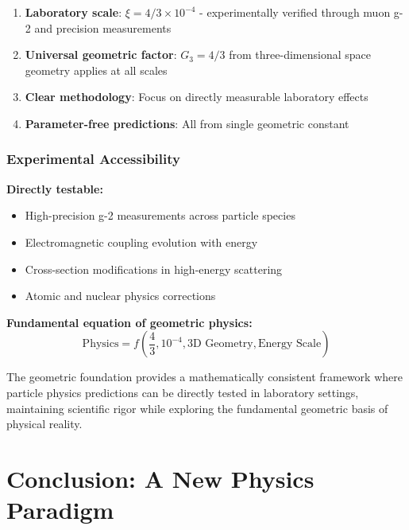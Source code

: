 \documentclass[12pt,a4paper]{report}
\begin{document}
\begin{enumerate}
	\item \textbf{Laboratory scale}: $\xi = 4/3 \times 10^{-4}$ - experimentally verified through muon g-2 and precision measurements
	
	\item \textbf{Universal geometric factor}: $G_3 = 4/3$ from three-dimensional space geometry applies at all scales
	
	\item \textbf{Clear methodology}: Focus on directly measurable laboratory effects
	
	\item \textbf{Parameter-free predictions}: All from single geometric constant
\end{enumerate}

\subsection{Experimental Accessibility}
\label{subsec:experimental_accessibility}

\textbf{Directly testable:}
\begin{itemize}
	\item High-precision g-2 measurements across particle species
	\item Electromagnetic coupling evolution with energy
	\item Cross-section modifications in high-energy scattering
	\item Atomic and nuclear physics corrections
\end{itemize}

\textbf{Fundamental equation of geometric physics:}
\begin{equation}
	\boxed{\text{Physics} = f\left(\frac{4}{3}, 10^{-4}, \text{3D Geometry}, \text{Energy Scale}\right)}
\end{equation}

The geometric foundation provides a mathematically consistent framework where particle physics predictions can be directly tested in laboratory settings, maintaining scientific rigor while exploring the fundamental geometric basis of physical reality.

\chapter{Conclusion: A New Physics Paradigm}
\label{chap:conclusion}
\end{document}
